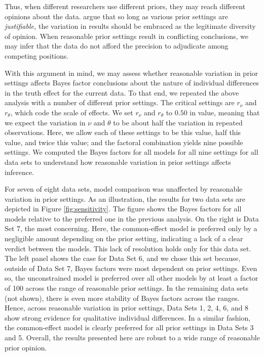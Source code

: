 \documentclass[
  english,
  ,man,floatsintext]{apa6}
\begin{document}
Thus, when different researchers use different priors, they may reach different opinions about the data. \textcite{rouder2016a} argue that so long as various prior settings are \emph{justifiable,} the variation in results should be embraced as the legitimate diversity of opinion. When reasonable prior settings result in conflicting conclusions, we may infer that the data do not afford the precision to adjudicate among competing positions.

With this argument in mind, we may assess whether reasonable variation in prior settings affects Bayes factor conclusions about the nature of individual differences in the truth effect for the current data. To that end, we repeated the above analysis with a number of different prior settings. The critical settings are \(r_\nu\) and \(r_\theta\), which code the scale of effects. We set \(r_\nu\) and \(r_\theta\) to \(0.50\) in value, meaning that we expect the variation in \(\nu\) and \(\theta\) to be about half the variation in repeated observations. Here, we allow each of these settings to be this value, half this value, and twice this value; and the factoral combination yields nine possible settings. We computed the Bayes factors for all models for all nine settings for all data sets to understand how reasonable variation in prior settings affects inference.

For seven of eight data sets, model comparison was unaffected by reasonable variation in prior settings. As an illustration, the results for two data sets are depicted in Figure \ref{fig:sensitivity}. The figure shows the Bayes factors for all models relative to the preferred one in the previous analysis. On the right is Data Set 7, the most concerning. Here, the common-effect model is preferred only by a negligible amount depending on the prior setting, indicating a lack of a clear verdict between the models. This lack of resolution holds only for this data set. The left panel shows the case for Data Set 6, and we chose this set because, outside of Data Set 7, Bayes factors were most dependent on prior settings. Even so, the unconstrained model is preferred over all other models by at least a factor of 100 across the range of reasonable prior settings. In the remaining data sets (not shown), there is even more stability of Bayes factors across the ranges. Hence, across reasonable variation in prior settings, Data Sets 1, 2, 4, 6, and 8 show strong evidence for qualitative individual differences. In a similar fashion, the common-effect model is clearly preferred for all prior settings in Data Sets 3 and 5. Overall, the results presented here are robust to a wide range of reasonable prior opinion.
\end{document}

